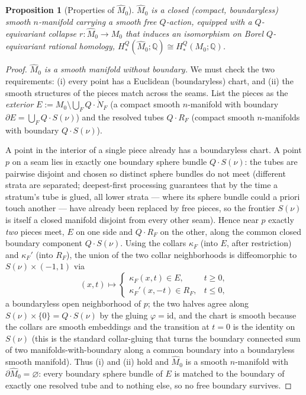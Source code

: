 \documentclass[12pt]{article}
\newtheorem{proposition}[theorem]{Proposition}
\theoremstyle{definition}
\begin{document}
\begin{proposition}[Properties of $\widehat M_0$]\label{prop:hatM}
$\widehat M_0$ is a closed (compact, \emph{boundaryless}) smooth $n$-manifold
carrying a smooth \emph{free} $Q$-action, equipped with a $Q$-equivariant
collapse $r\colon\widehat M_0\to M_0$ that induces an isomorphism on Borel
$Q$-equivariant rational homology, $H^Q_*(\widehat M_0;\mathbb{Q})\cong
H^Q_*(M_0;\mathbb{Q})$.
\end{proposition}
\begin{proof}
\emph{$\widehat M_0$ is a smooth manifold without boundary.} We must check the
two requirements: (i) every point has a Euclidean (boundaryless) chart, and
(ii) the smooth structures of the pieces match across the seams. List the pieces
as the \emph{exterior}
$E:=M_0\setminus\bigcup_F Q\cdot\mathring N_F$ (a compact smooth $n$-manifold
with boundary $\partial E=\bigcup_F Q\cdot S(\nu)$) and the resolved tubes
$Q\cdot R_F$ (compact smooth $n$-manifolds with boundary $Q\cdot S(\nu)$).

A point in the interior of a single piece already has a boundaryless chart. A
point $p$ on a seam lies in exactly one boundary sphere bundle $Q\cdot S(\nu)$:
the tubes are pairwise disjoint and chosen so distinct sphere bundles do not
meet (different strata are separated; deepest-first processing guarantees that by
the time a stratum's tube is glued, all lower strata --- where its sphere bundle
could a priori touch another --- have already been replaced by free pieces, so
the frontier $S(\nu)$ is itself a closed manifold disjoint from every other
seam). Hence near $p$ exactly \emph{two} pieces meet, $E$ on one side and
$Q\cdot R_F$ on the other, along the common closed boundary component
$Q\cdot S(\nu)$. Using the collars $\kappa_F$ (into $E$, after restriction) and
$\kappa_F'$ (into $R_F$), the union of the two collar neighborhoods is
diffeomorphic to $S(\nu)\times(-1,1)$ via
\[
   (x,t)\longmapsto
   \begin{cases}\kappa_F(x,t)\in E, & t\ge 0,\\[2pt]
                \kappa_F'(x,-t)\in R_F, & t\le 0,\end{cases}
\]
a boundaryless open neighborhood of $p$; the two halves agree along
$S(\nu)\times\{0\}=Q\cdot S(\nu)$ by the gluing $\varphi=\mathrm{id}$, and the
chart is smooth because the collars are smooth embeddings and the transition at
$t=0$ is the identity on $S(\nu)$ (this is the standard collar-gluing that turns
the boundary connected sum of two manifolds-with-boundary along a common
boundary into a boundaryless smooth manifold). Thus (i) and (ii) hold and
$\widehat M_0$ is a smooth $n$-manifold with $\partial\widehat M_0=\varnothing$:
every boundary sphere bundle of $E$ is matched to the boundary of exactly one
resolved tube and to nothing else, so no free boundary survives.


\end{proof}
\end{document}
